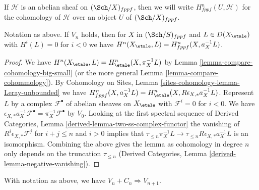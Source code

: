 \noindent
If $\mathcal{H}$ is an abelian sheaf on $(\Sch/X)_{fppf}$,
then we will write $H^n_{fppf}(U, \mathcal{H})$ for the cohomology
of $\mathcal{H}$ over an object $U$ of $(\Sch/X)_{fppf}$.

\begin{lemma}
\label{lemma-V-implies-cohomology-etale-fppf}
Notation as above. If $V_n$ holds, then for
$X$ in $(\Sch/S)_{fppf}$ and $L \in D(X_\etale)$
with $H^i(L) = 0$ for $i < 0$
we have $H^n(X_\etale, L) = H^n_{fppf}(X, a_X^{-1}L)$.
\end{lemma}

\begin{proof}
We have $H^n(X_\etale, L) = H^n_\etale(X, \pi_X^{-1}L)$ by
Lemma \ref{lemma-compare-cohomology-big-small} (or the more general
Lemma \ref{lemma-compare-cohommology}).
By Cohomology on Sites, Lemma \ref{sites-cohomology-lemma-Leray-unbounded}
we have
$H^n_{fppf}(X, a_X^{-1}L) = H^n_\etale(X, R\epsilon_{X, *}a_X^{-1}L)$.
Represent $L$ by a complex $\mathcal{F}^\bullet$ of abelian
sheaves on $X_\etale$ with $\mathcal{F}^i = 0$ for $i < 0$. We have
$\epsilon_{X, *} a_X^{-1} \mathcal{F}^\bullet = \pi_X^{-1} \mathcal{F}^\bullet$
by $V_0$.
Looking at the first spectral sequence of
Derived Categories, Lemma \ref{derived-lemma-two-ss-complex-functor}
the vanishing of $R^i\epsilon_{X, *}\mathcal{F}^j$ for
$i + j \leq n$ and $i > 0$ implies that
$\tau_{\leq n} \pi_X^{-1} L \to \tau_{\leq n} R\epsilon_{X, *}a_X^{-1}L$
is an isomorphism. Combining the above gives the lemma
as cohomology in degree $n$ only depends on the truncation
$\tau_{\leq n}$ (Derived Categories, Lemma
\ref{derived-lemma-negative-vanishing}).
\end{proof}

\begin{lemma}
\label{lemma-induction-step-V-C-etale-fppf}
With notation as above, we have $V_n + C_n \Rightarrow V_{n + 1}$.
\end{lemma}

